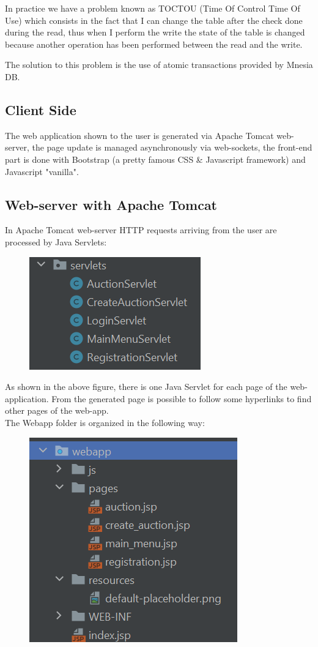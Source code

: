 \noindent In practice we have a problem known as TOCTOU (Time Of Control Time Of Use) which consists in the fact that I can change the table after the check done during the read, thus when I perform the write the state of the table is changed because another operation has been performed between the read and the write.

\noindent The solution to this problem is the use of atomic transactions provided by Mnesia DB.

\subsection{Client Side}
The web application shown to the user is generated via Apache Tomcat web-server, the page update is managed asynchronously via web-sockets, the front-end part is done with Bootstrap (a pretty famous CSS \& Javascript framework) and Javascript "vanilla". 

\subsection{Web-server with Apache Tomcat}
In Apache Tomcat web-server HTTP requests arriving from the user are processed by Java Servlets:\\

 \begin{figure}[H]
 	\centering
 	\includegraphics[width=0.4\linewidth]{img/servlets}
 	\caption{}
 	\label{fig:servlets}
 \end{figure}
 

As shown in the above figure, there is one Java Servlet for each page of the web-application. From the generated page is possible to follow some hyperlinks to find other pages of the web-app.\\
The Webapp folder is organized in the following way:
\begin{figure}[H]
	\centering
	\includegraphics[width=0.4\linewidth]{img/webapp}
	\caption{}
	\label{fig:webapp}
\end{figure}


